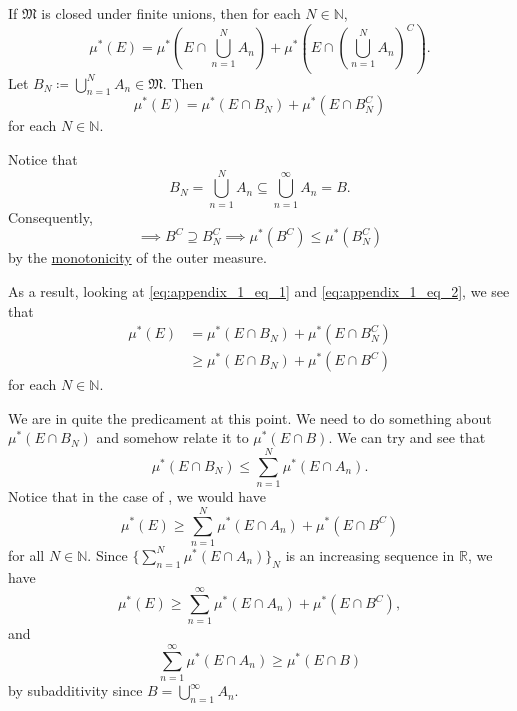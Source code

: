 \documentclass[notoc,notitlepage]{tufte-book}
\begin{document}
If $\mathfrak{M}$ is closed under finite unions,
then for each $N \in \mathbb{N}$,
\begin{equation*}
  \mu^*(E) = \mu^* \left( E \cap \bigcup_{n=1}^{N} A_n \right)
    + \mu^* \left( E \cap \left( \bigcup_{n=1}^{N} A_n \right)^C \right).
\end{equation*}
Let $B_N \coloneqq \bigcup_{n=1}^{N} A_n \in \mathfrak{M}$. Then
\begin{equation}\tag{$\dagger$}\label{eq:appendix_1_eq_2}
  \mu^*(E) = \mu^* (E \cap B_N) + \mu^* (E \cap B_N^C)
\end{equation}
for each $N \in \mathbb{N}$.

Notice that
\begin{equation*}
  B_N = \bigcup_{n=1}^{N} A_n \subseteq \bigcup_{n=1}^{\infty} A_n = B.
\end{equation*}
Consequently,
\begin{equation*}
  \implies B^C \supseteq B_N^C \implies \mu^*(B^C) \leq \mu^*(B_N^C)
\end{equation*}
by the \hyperref[defn:outer_measure]{monotonicity} of the outer measure.

As a result, looking at \cref{eq:appendix_1_eq_1} and \cref{eq:appendix_1_eq_2},
we see that
\begin{align*}
  \mu^*(E) &= \mu^*(E \cap B_N) + \mu^*(E \cap B_N^C) \\
           &\geq \mu^*(E \cap B_N) + \mu^*(E \cap B^C)
\end{align*}
for each $N \in \mathbb{N}$.

We are in quite the predicament at this point.
We need to do something about $\mu^*(E \cap B_N)$
and somehow relate it to $\mu^*(E \cap B)$.
We can try and see that
\begin{equation*}
  \mu^*(E \cap B_N) \leq \sum_{n=1}^{N} \mu^*(E \cap A_n).
\end{equation*}
Notice that in the case of , we would have
\begin{equation*}
  \mu^*(E) \geq \sum_{n=1}^{N} \mu^*(E \cap A_n) + \mu^*(E \cap B^C)
\end{equation*}
for all $N \in \mathbb{N}$.
Since $\{ \sum_{n=1}^{N} \mu^*(E \cap A_n) \}_{N}$ is an increasing sequence
in $\mathbb{R}$, we have
\begin{equation*}
  \mu^*(E) \geq \sum_{n=1}^{\infty} \mu^*(E \cap A_n) + \mu^*(E \cap B^C),
\end{equation*}
and
\begin{equation*}
  \sum_{n=1}^{\infty} \mu^*(E \cap A_n) \geq \mu^*(E \cap B)
\end{equation*}
by subadditivity since $B = \bigcup_{n=1}^{\infty} A_n$.
\end{document}
